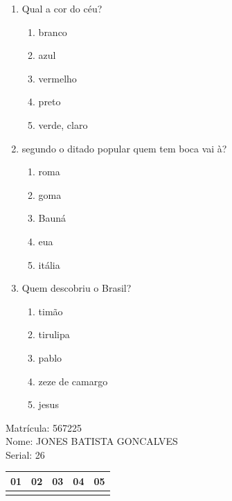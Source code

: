 \documentclass[10pt,a4paper,twocolumn]{report}
\begin{document}
 \begin{enumerate} 
    \item  Qual a cor do céu?





    \begin{enumerate}
    \item  branco

\item  azul

\item  vermelho

\item  preto

\item  verde, claro


    \end{enumerate} 
    \item  segundo o ditado popular quem tem boca vai à?





    \begin{enumerate}
    \item  roma

\item  goma

\item  Bauná

\item  eua

\item  itália


    \end{enumerate} 
    \item  Quem descobriu o Brasil?





    \begin{enumerate}
    \item  timão

\item  tirulipa

\item  pablo

\item  zeze de camargo

\item  jesus


    \end{enumerate}\end{enumerate} 
Matrícula: 567225\\ Nome: JONES BATISTA GONCALVES \\ Serial: 26\\
\begin{tabular}{|l|l|l|l|l|}\hline
01  &02  &03  &04  &05 \\ \hline 
 & & & & \\ \hline 
\end{tabular}
 \cleardoublepage 
\end{document}

